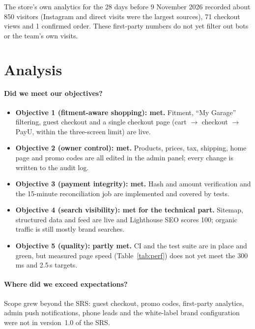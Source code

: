 \documentclass{tietreport}
\begin{document}
The store's own analytics for the 28 days before 9 November 2026 recorded
about 850 visitors (Instagram and direct visits were the largest sources),
71 checkout views and 1 confirmed order. These first-party numbers do not yet
filter out bots or the team's own visits.

\section{Analysis}

\paragraph{Did we meet our objectives?}
\begin{itemize}
  \item \textbf{Objective 1 (fitment-aware shopping): met.} Fitment, ``My
        Garage'' filtering, guest checkout and a single checkout page (cart $\rightarrow$
        checkout $\rightarrow$ PayU, within the three-screen limit) are live.
  \item \textbf{Objective 2 (owner control): met.} Products, prices, tax,
        shipping, home page and promo codes are all edited in the admin panel;
        every change is written to the audit log.
  \item \textbf{Objective 3 (payment integrity): met.} Hash and amount
        verification and the 15-minute reconciliation job are implemented and
        covered by tests.
  \item \textbf{Objective 4 (search visibility): met for the technical part.}
        Sitemap, structured data and feed are live and Lighthouse SEO scores
        100; organic traffic is still mostly brand searches.
  \item \textbf{Objective 5 (quality): partly met.} CI and the test suite are
        in place and green, but measured page speed (Table~\ref{tab:perf})
        does not yet meet the 300\,ms and 2.5\,s targets.
\end{itemize}

\paragraph{Where did we exceed expectations?}
Scope grew beyond the SRS: guest checkout, promo codes, first-party analytics,
admin push notifications, phone leads and the white-label brand
configuration were not in version~1.0 of the SRS.
\end{document}

